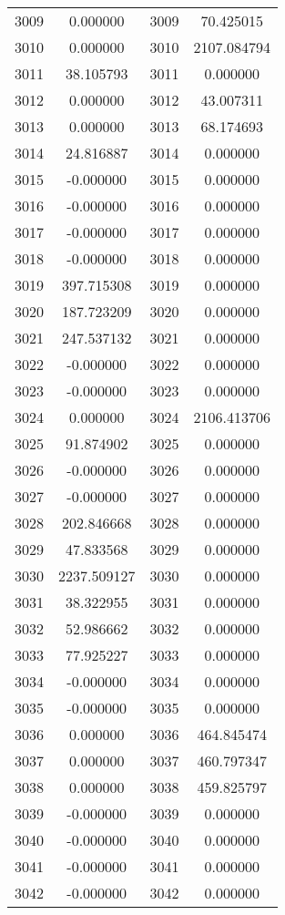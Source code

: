 \documentclass[12pt]{article}
\begin{document}
\begin{longtable}{@{}cccc@{}}
3009 & 0.000000 & 3009 & 70.425015 \\
3010 & 0.000000 & 3010 & 2107.084794 \\
3011 & 38.105793 & 3011 & 0.000000 \\
3012 & 0.000000 & 3012 & 43.007311 \\
3013 & 0.000000 & 3013 & 68.174693 \\
3014 & 24.816887 & 3014 & 0.000000 \\
3015 & -0.000000 & 3015 & 0.000000 \\
3016 & -0.000000 & 3016 & 0.000000 \\
3017 & -0.000000 & 3017 & 0.000000 \\
3018 & -0.000000 & 3018 & 0.000000 \\
3019 & 397.715308 & 3019 & 0.000000 \\
3020 & 187.723209 & 3020 & 0.000000 \\
3021 & 247.537132 & 3021 & 0.000000 \\
3022 & -0.000000 & 3022 & 0.000000 \\
3023 & -0.000000 & 3023 & 0.000000 \\
3024 & 0.000000 & 3024 & 2106.413706 \\
3025 & 91.874902 & 3025 & 0.000000 \\
3026 & -0.000000 & 3026 & 0.000000 \\
3027 & -0.000000 & 3027 & 0.000000 \\
3028 & 202.846668 & 3028 & 0.000000 \\
3029 & 47.833568 & 3029 & 0.000000 \\
3030 & 2237.509127 & 3030 & 0.000000 \\
3031 & 38.322955 & 3031 & 0.000000 \\
3032 & 52.986662 & 3032 & 0.000000 \\
3033 & 77.925227 & 3033 & 0.000000 \\
3034 & -0.000000 & 3034 & 0.000000 \\
3035 & -0.000000 & 3035 & 0.000000 \\
3036 & 0.000000 & 3036 & 464.845474 \\
3037 & 0.000000 & 3037 & 460.797347 \\
3038 & 0.000000 & 3038 & 459.825797 \\
3039 & -0.000000 & 3039 & 0.000000 \\
3040 & -0.000000 & 3040 & 0.000000 \\
3041 & -0.000000 & 3041 & 0.000000 \\
3042 & -0.000000 & 3042 & 0.000000 \\

\end{longtable}
\end{document}
